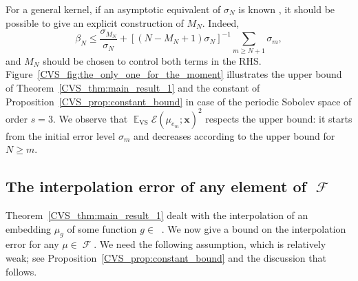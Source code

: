 \documentclass[twoside,11pt]{book}
\newtheorem{theorem}{Theorem}
\numberwithin{theorem}{chapter}
\numberwithin{definition}{chapter}
\numberwithin{proposition}{chapter}
\numberwithin{corollary}{chapter}
\numberwithin{example}{chapter}
\numberwithin{lemma}{chapter}
\numberwithin{assumption}{chapter}
\DeclareMathOperator{\VS}{\mathrm{VS}}
\DeclareMathOperator{\EX}{\mathbb{E}}
\DeclareMathOperator{\F}{\mathcal{F}}
\DeclareMathOperator{\Ltwo}{\mathbb{L}_{2}(\mathrm{d} \omega)}
\newcommand{\pc}[1]{\textcolor{blue}{#1}}
\begin{document}
 For a general kernel, if an asymptotic equivalent of $\sigma_{N}$ is known \citep{Wid63,Wid64}, it should be possible to give an explicit construction of $M_N$. Indeed,
\begin{equation}
 \beta_{N} \leq \frac{\sigma_{M_{N}}}{\sigma_{N}} + [{(N-M_{N}+1)\sigma_{N}}]^{-1} \sum\limits_{m \geq N+1}\sigma_{m},
\end{equation}
and $M_{N}$ should be chosen to control both terms in the RHS.
%
Figure~\ref{CVS_fig:the_only_one_for_the_moment} illustrates the upper bound of Theorem~\ref{CVS_thm:main_result_1} and the constant of Proposition~\ref{CVS_prop:constant_bound} in case of the periodic Sobolev space of order $s=3$. We observe that $\EX_{\VS} \mathcal{E}(\mu_{e_m};\bm{x})^{2}$ respects the upper bound: it starts from the initial error level $\sigma_m$ and decreases according to the upper bound for $N \geq m$.




\subsection{The interpolation error of any element of $\F$}\label{CVS_sec:main_theorems_2}
%
%
Theorem~\ref{CVS_thm:main_result_1} dealt with the interpolation of an embedding $\mu_{g}$ of some function $g\in\Ltwo$. We now give a bound on the interpolation error for any $\mu\in\F$. We need the following assumption, which is relatively weak; see Proposition~\ref{CVS_prop:constant_bound} and the discussion that follows.
\end{document}

